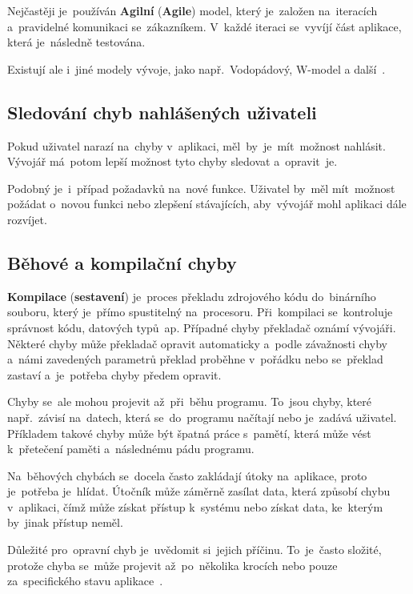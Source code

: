 \documentclass[11pt,a4paper]{report}
\begin{document}
                Nejčastěji je~používán \textbf{Agilní} (\textbf{Agile}) model, který je~založen na~iteracích a~pravidelné komunikaci se~zákazníkem. V~každé iteraci se~vyvíjí část aplikace, která je~následně testována.
                
                Existují ale i~jiné modely vývoje, jako např.~Vodopádový, W-model a další~\cite{sdlc:kadlec2004agilni}.

            \subsection{Sledování chyb nahlášených uživateli}
                Pokud uživatel narazí na~chyby v~aplikaci, měl~by~je~mít~možnost nahlásit. Vývojář má~potom lepší možnost tyto chyby sledovat a~opravit~je.

                Podobný je~i~případ požadavků na~nové funkce. Uživatel by~měl mít~možnost požádat o~novou funkci nebo zlepšení stávajících,
                aby~vývojář mohl aplikaci dále rozvíjet.

            \subsection{Běhové a kompilační chyby}
                \textbf{Kompilace} (\textbf{sestavení}) je~proces překladu zdrojového kódu do~binárního souboru, který je~přímo spustitelný na~procesoru. Při~kompilaci se~kontroluje správnost kódu, datových typů~ap. Případné chyby překladač oznámí vývojáři. Některé chyby může překladač opravit automaticky a~podle závažnosti chyby a~námi zavedených parametrů překlad proběhne v~pořádku nebo se~překlad zastaví a~je~potřeba chyby předem opravit.

                Chyby se~ale mohou projevit až~při~běhu programu. To~jsou chyby, které např.~závisí na~datech, která se~do~programu načítají nebo je~zadává uživatel. Příkladem takové chyby může být špatná práce s~pamětí, která může vést k~přetečení paměti a~následnému pádu programu.

                Na~běhových chybách se~docela často zakládají útoky na~aplikace, proto je~potřeba je~hlídat. Útočník může záměrně zasílat data, která způsobí chybu v~aplikaci, čímž může získat přístup k~systému nebo získat data, ke~kterým by~jinak přístup neměl.

                Důležité pro~opravní chyb je~uvědomit si~jejich příčinu. To~je~často složité, protože chyba se~může projevit až~po~několika krocích nebo pouze za~specifického stavu aplikace~\cite{graham2021ethical}.
\end{document}
